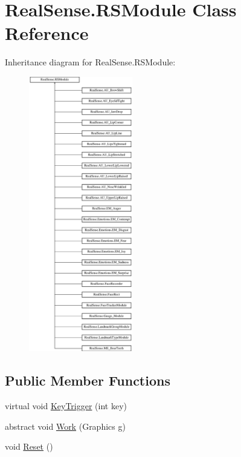 \hypertarget{class_real_sense_1_1_r_s_module}{}\section{Real\+Sense.\+R\+S\+Module Class Reference}
\label{class_real_sense_1_1_r_s_module}
Inheritance diagram for Real\+Sense.\+R\+S\+Module\+:\begin{figure}[H]
\begin{center}
\leavevmode
\includegraphics[height=12.000000cm]{class_real_sense_1_1_r_s_module}
\end{center}
\end{figure}
\subsection*{Public Member Functions}
\begin{DoxyCompactItemize}
\item 
virtual void \hyperlink{class_real_sense_1_1_r_s_module_a8434d4aa8c289766b24e67cabb7e9471}{Key\+Trigger} (int key)
\item 
abstract void \hyperlink{class_real_sense_1_1_r_s_module_a2ec830b7932ee7c0077d473f81c73867}{Work} (Graphics g)
\item 
void \hyperlink{class_real_sense_1_1_r_s_module_a5dc0fb567c84392f2469f5ed6445b10b}{Reset} ()
\end{DoxyCompactItemize}
